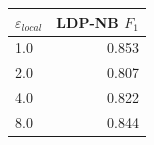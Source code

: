 \begin{tabular}{lr}
\toprule
$\varepsilon_{local}$ & LDP-NB $F_1$ \\
\midrule
1.0 & 0.853 \\
2.0 & 0.807 \\
4.0 & 0.822 \\
8.0 & 0.844 \\
\bottomrule
\end{tabular}
